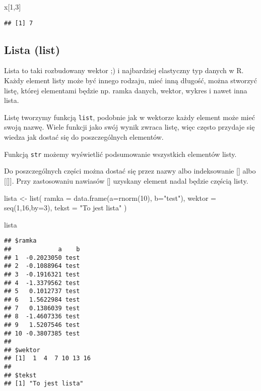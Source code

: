 \documentclass[
]{book}
\newenvironment{Shaded}{\begin{snugshade}}{\end{snugshade}}
\newcommand{\AttributeTok}[1]{\textcolor[rgb]{0.77,0.63,0.00}{#1}}
\newcommand{\DecValTok}[1]{\textcolor[rgb]{0.00,0.00,0.81}{#1}}
\newcommand{\FunctionTok}[1]{\textcolor[rgb]{0.00,0.00,0.00}{#1}}
\newcommand{\NormalTok}[1]{#1}
\newcommand{\OtherTok}[1]{\textcolor[rgb]{0.56,0.35,0.01}{#1}}
\newcommand{\StringTok}[1]{\textcolor[rgb]{0.31,0.60,0.02}{#1}}
\begin{document}
\begin{Shaded}
\begin{Highlighting}[]
\NormalTok{x[}\DecValTok{1}\NormalTok{,}\DecValTok{3}\NormalTok{]}
\end{Highlighting}
\end{Shaded}

\begin{verbatim}
## [1] 7
\end{verbatim}

\hypertarget{lista-list}{%
\subsection{Lista (list)}\label{lista-list}}

Lista to taki rozbudowany wektor ;) i najbardziej elastyczny typ danych w R. Każdy element listy może być innego rodzaju, mieć inną długość, można stworzyć listę, której elementami będzie np. ramka danych, wektor, wykres i nawet inna lista.

Listę tworzymy funkcją \texttt{list}, podobnie jak w wektorze każdy element może mieć swoją nazwę. Wiele funkcji jako swój wynik zwraca listę, więc często przydaje się wiedza jak dostać się do poszczególnych elementów.

Funkcją \texttt{str} możemy wyświetlić podsumowanie wszystkich elementów listy.

Do poszczególnych części można dostać się przez nazwy albo indeksowanie {[}{]} albo {[}{[}{]}{]}. Przy zastosowaniu nawiasów {[}{]} uzyskany element nadal będzie częścią listy.

\begin{Shaded}
\begin{Highlighting}[]
\NormalTok{lista }\OtherTok{\textless{}{-}} \FunctionTok{list}\NormalTok{( }\AttributeTok{ramka =} \FunctionTok{data.frame}\NormalTok{(}\AttributeTok{a=}\FunctionTok{rnorm}\NormalTok{(}\DecValTok{10}\NormalTok{), }\AttributeTok{b=}\StringTok{"test"}\NormalTok{), }
               \AttributeTok{wektor =} \FunctionTok{seq}\NormalTok{(}\DecValTok{1}\NormalTok{,}\DecValTok{16}\NormalTok{,}\AttributeTok{by=}\DecValTok{3}\NormalTok{), }
               \AttributeTok{tekst =} \StringTok{"To jest lista"}\NormalTok{ )}

\NormalTok{lista}
\end{Highlighting}
\end{Shaded}

\begin{verbatim}
## $ramka
##             a    b
## 1  -0.2023050 test
## 2  -0.1088964 test
## 3  -0.1916321 test
## 4  -1.3379562 test
## 5   0.1012737 test
## 6   1.5622984 test
## 7   0.1386039 test
## 8  -1.4607336 test
## 9   1.5207546 test
## 10 -0.3807385 test
## 
## $wektor
## [1]  1  4  7 10 13 16
## 
## $tekst
## [1] "To jest lista"
\end{verbatim}
\end{document}
